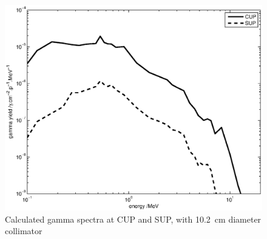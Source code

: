 \documentclass[peerreviewca,11pt,a4paper]{IEEEtran}
\let\MYoriglatexcaption\caption
\renewcommand{\caption}[2][\relax]{\MYoriglatexcaption[#2]{#2}}
\begin{document}
\begin{figure}[t]
    \centering
    \includegraphics[width=0.9\columnwidth]{gDYieldcomparedRADECS.eps}
    \caption{
        Calculated gamma spectra at CUP and SUP, with
        \SI{10.2}{\cm} diameter collimator
    }
    \label{fig:DifferentialGammaSpectra}
\end{figure}
\end{document}
